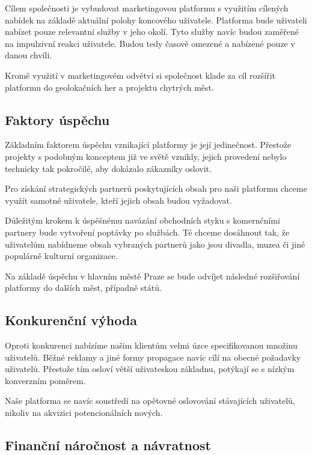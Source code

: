 \documentclass[12pt,czech]{article}
\begin{document}
Cílem společnosti je vybudovat marketingovou platformu s využitím cílených nabídek na základě aktuální polohy koncového uživatele.
Platforma bude uživateli nabízet pouze relevantní služby v jeho okolí.
Tyto služby navíc budou zaměřené na impulzivní reakci uživatele.
Budou tedy časově omezené a nabízené pouze v danou chvíli.

\medskip

Kromě využití v marketingovém odvětví si společnost klade za cíl rozšířit platformu do geolokačních her a projektu chytrých měst.

\subsection{Faktory úspěchu}

Základním faktorem úspěchu vznikající platformy je její jedinečnost.
Přestože projekty s podobným konceptem již ve světě vznikly, jejich provedení nebylo technicky tak pokročilé, aby dokázalo zákazníky oslovit.

Pro získání strategických partnerů poskytujících obsah pro naši platformu chceme využít samotné uživatele, kteří jejich obsah budou vyžadovat.

\medskip

Důležitým krokem k úspěšnému navázání obchodních styku s komernčními partnery bude vytvoření poptávky po službách.
Té chceme dosáhnout tak, že uživatelům nabídneme obsah vybraných partnerů jako jsou divadla, muzea či jiné populárně kulturní organizace.

Na základě úspěchu v hlavním městě Praze se bude odvíjet následné rozšiřování platformy do dalších měst, případně států.

\subsection{Konkurenční výhoda}

Oproti konkurenci nabízíme našim klientům velmi úzce specifikovanou množinu uživatelů.
Běžné reklamy a jiné formy propagace navíc cílí na obecné požadavky uživatelů.
Přestože tím osloví větší uživateskou základnu, potýkají se s nízkým konverzním poměrem.

Naše platforma se navíc soustředí na opětovné oslovování stávajících uživatelů, nikoliv na akvizici potencionálních nových.

\subsection{Finanční náročnost a návratnost}
\end{document}
